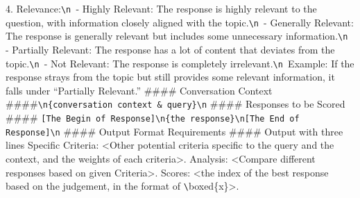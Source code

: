 \documentclass{article} %
\begin{document}
\begin{tcolorbox}[title={LLM-as-a-Judge}, colbacktitle=blue!50!white, coltitle=white, fonttitle=\bfseries, colback=blue!10!white, boxrule=0pt, breakable]
4. Relevance:\verb|\n |- Highly Relevant: The response is highly relevant to the question, with information closely aligned with the topic.\verb|\n |- Generally Relevant: The response is generally relevant but includes some unnecessary information.\verb|\n |- Partially Relevant: The response has a lot of content that deviates from the topic.\verb|\n |- Not Relevant: The response is completely irrelevant.\verb|\n |Example: If the response strays from the topic but still provides some relevant information, it falls under ``Partially Relevant.''\newline
\newline
\#\#\#\# Conversation Context \#\#\#\#\verb|\n|\verb|{conversation context & query}|\verb|\n|\newline
\#\#\#\# Responses to be Scored \#\#\#\#\newline
\verb|[The Begin of Response]\n{the response}\n[The End of Response]\n|
\newline
\#\#\#\# Output Format Requirements \#\#\#\#\newline\newline
Output with three lines\newline
Specific Criteria: <Other potential criteria specific to the query and the context, and the weights of each criteria>.\newline
Analysis: <Compare different responses based on given Criteria>.\newline
Scores: <the index of the best response based on the judgement, in the format of \verb|\|boxed\{x\}>. 
\end{tcolorbox}
\end{document}
